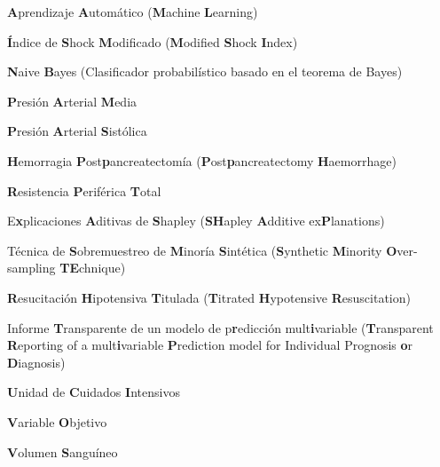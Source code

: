 \documentclass[12pt, letterpaper]{article}
\begin{document}
\begin{description}[style=multiline, leftmargin=3.5cm, font=\bfseries]
    \item[ML] \textbf{A}prendizaje \textbf{A}utomático (\textbf{M}achine \textbf{L}earning)
    \item[MSI] \textbf{Í}ndice de \textbf{S}hock \textbf{M}odificado (\textbf{M}odified \textbf{S}hock \textbf{I}ndex)
    \item[NB] \textbf{N}aive \textbf{B}ayes (Clasificador probabilístico basado en el teorema de Bayes)
    \item[PAM] \textbf{P}resión \textbf{A}rterial \textbf{M}edia
    \item[PAS] \textbf{P}resión \textbf{A}rterial \textbf{S}istólica
    \item[PPH] \textbf{H}emorragia \textbf{P}ost\textbf{p}ancreatectomía (\textbf{P}ost\textbf{p}ancreatectomy \textbf{H}aemorrhage)
    \item[RPT] \textbf{R}esistencia \textbf{P}eriférica \textbf{T}otal
    \item[SHAP] E\textbf{x}plicaciones \textbf{A}ditivas de \textbf{S}hapley (\textbf{SH}apley \textbf{A}dditive ex\textbf{P}lanations)
    \item[SMOTE] Técnica de \textbf{S}obremuestreo de \textbf{M}inoría \textbf{S}intética (\textbf{S}ynthetic \textbf{M}inority \textbf{O}ver-sampling \textbf{TE}chnique)
    \item[THR] \textbf{R}esucitación \textbf{H}ipotensiva \textbf{T}itulada (\textbf{T}itrated \textbf{H}ypotensive \textbf{R}esuscitation)
    \item[TRIPOD] Informe \textbf{T}ransparente de un modelo de p\textbf{r}edicción mult\textbf{i}variable (\textbf{T}ransparent \textbf{R}eporting of a mult\textbf{i}variable \textbf{P}rediction model for Individual Prognosis \textbf{o}r \textbf{D}iagnosis)
    \item[UCI] \textbf{U}nidad de \textbf{C}uidados \textbf{I}ntensivos
    \item[VO] \textbf{V}ariable \textbf{O}bjetivo
    \item[VS] \textbf{V}olumen \textbf{S}anguíneo
\end{description}
\newpage

\mbox{}               
\newpage        

\end{document}
